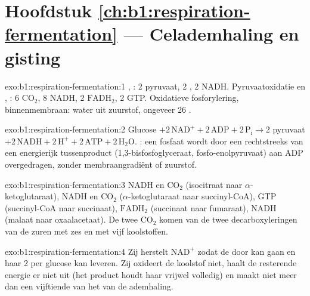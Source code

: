 \section*{Hoofdstuk \ref{ch:b1:respiration-fermentation} --- Celademhaling en gisting}

\begin{solution}{exo:b1:respiration-fermentation:1}
, : 2 pyruvaat, 2 , 2 NADH. Pyruvaatoxidatie en ,
: 6 $\mathrm{CO_2}$, 8 NADH, 2 $\mathrm{FADH_2}$, 2 GTP.
Oxidatieve fosforylering, binnenmembraan: water uit zuurstof, ongeveer 26 .
\end{solution}

\begin{solution}{exo:b1:respiration-fermentation:2}
Glucose $+ 2\,\mathrm{NAD^+} + 2\,\mathrm{ADP} + 2\,\mathrm{P_i} \to
2$ pyruvaat $+ 2\,\mathrm{NADH} + 2\,\mathrm{H^+} + 2\,\mathrm{ATP} +
2\,\mathrm{H_2O}$. : een fosfaat wordt door een 
rechtstreeks van een energierijk tussenproduct (1,3-bisfosfoglyceraat,
fosfo-enolpyruvaat) aan ADP overgedragen, zonder membraangradiënt of zuurstof.
\end{solution}

\begin{solution}{exo:b1:respiration-fermentation:3}
NADH en $\mathrm{CO_2}$ (isocitraat naar $\alpha$-ketoglutaraat), NADH en
$\mathrm{CO_2}$ ($\alpha$-ketoglutaraat naar succinyl-CoA), GTP (succinyl-CoA naar
succinaat), $\mathrm{FADH_2}$ (succinaat naar fumaraat), NADH (malaat naar
oxaalacetaat). De twee $\mathrm{CO_2}$ komen van de twee decarboxyleringen van de
zuren met zes en met vijf koolstoffen.
\end{solution}

\begin{solution}{exo:b1:respiration-fermentation:4}
Zij herstelt $\mathrm{NAD^+}$ zodat de  door kan gaan en haar 2  per
glucose kan leveren. Zij oxideert de koolstof niet, haalt de resterende energie er
niet uit (het product houdt haar vrijwel volledig) en maakt niet meer dan een
vijftiende van het  van de ademhaling.
\end{solution}

